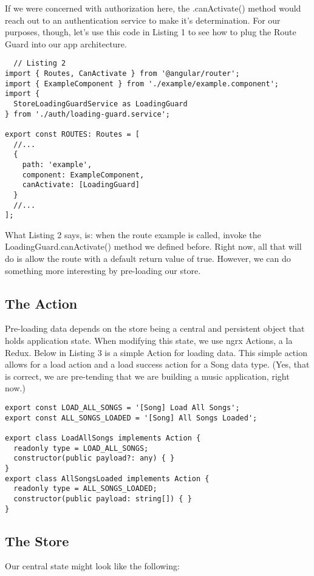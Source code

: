 If we were concerned with authorization here, the .canActivate() method would
reach out to an authentication service to make it's determination. For our
purposes, though, let's use this code in Listing 1 to see how to plug the Route
Guard into our app architecture.

\begin{lstlisting}
  // Listing 2
import { Routes, CanActivate } from '@angular/router';
import { ExampleComponent } from './example/example.component';
import {
  StoreLoadingGuardService as LoadingGuard
} from './auth/loading-guard.service';

export const ROUTES: Routes = [
  //...
  {
    path: 'example',
    component: ExampleComponent,
    canActivate: [LoadingGuard]
  }
  //...
];

\end{lstlisting}

What Listing 2 says, is: when the route example is called, invoke the
LoadingGuard.canActivate() method we defined before. Right now, all that will
do is allow the route with a default return value of true. However, we can do
something more interesting by pre-loading our store.

\subsection{ The Action }
Pre-loading data depends on the store being a central and persistent object that
holds application state. When modifying this state, we use ngrx Actions, a la
Redux.  Below in Listing 3 is a simple Action for loading data. This simple
action allows for a load action and a load success action for a Song data type.
(Yes, that is correct, we are pre-tending that we are building a music
application, right now.)

\begin{lstlisting}
export const LOAD_ALL_SONGS = '[Song] Load All Songs';
export const ALL_SONGS_LOADED = '[Song] All Songs Loaded';

export class LoadAllSongs implements Action {
  readonly type = LOAD_ALL_SONGS;
  constructor(public payload?: any) { }
}
export class AllSongsLoaded implements Action {
  readonly type = ALL_SONGS_LOADED;
  constructor(public payload: string[]) { }
}
\end{lstlisting}

\subsection{The Store}
Our central state might look like the following:

